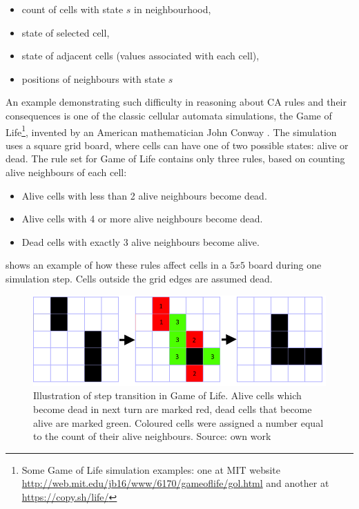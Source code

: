 \documentclass[12pt]{report}
\begin{document}
\begin{itemize}
	\item count of cells with state $s$ in neighbourhood,
	\item state of selected cell,
	\item state of adjacent cells (values associated with each cell),
	\item positions of neighbours with state $s$ 
\end{itemize}

An example demonstrating such difficulty in reasoning about CA rules and their consequences is one of the classic cellular automata simulations, the Game of Life\footnote{Some Game of Life simulation examples: one at MIT website \url{http://web.mit.edu/jb16/www/6170/gameoflife/gol.html} and another at \url{https://copy.sh/life/}}, invented by an American mathematician John Conway \autocite{conway1970game}. The simulation uses a square grid board, where cells can have one of two possible states: alive or dead. The rule set for Game of Life contains only three rules, based on counting alive neighbours of each cell: 

\begin{itemize}
	\item Alive cells with less than 2 alive neighbours become dead.
	\item Alive cells with 4 or more alive neighbours become dead.
	\item Dead cells with exactly 3 alive neighbours become alive.
\end{itemize}

 shows an example of how these rules affect cells in a $5x5$ board during one simulation step. Cells outside the grid edges are assumed dead. 

\begin{figure}[h]
	\centering
	\includegraphics[width=0.7\linewidth]{images/applygol} 
	\caption{Illustration of step transition in Game of Life. Alive cells which become dead in next turn are marked red, dead cells that become alive are marked green. Coloured cells were assigned a number equal to the count of their alive neighbours. Source: own work}
	\label{fig:applygol}
\end{figure}
\end{document}
